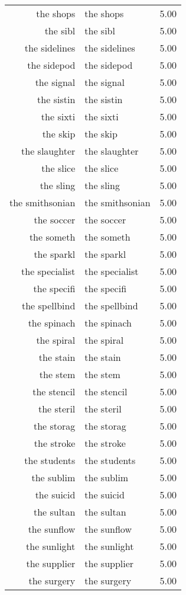 \begin{table}[ht]
\begin{tabular}{rlr}
  the shops & the shops & 5.00 \\ 
  the sibl & the sibl & 5.00 \\ 
  the sidelines & the sidelines & 5.00 \\ 
  the sidepod & the sidepod & 5.00 \\ 
  the signal & the signal & 5.00 \\ 
  the sistin & the sistin & 5.00 \\ 
  the sixti & the sixti & 5.00 \\ 
  the skip & the skip & 5.00 \\ 
  the slaughter & the slaughter & 5.00 \\ 
  the slice & the slice & 5.00 \\ 
  the sling & the sling & 5.00 \\ 
  the smithsonian & the smithsonian & 5.00 \\ 
  the soccer & the soccer & 5.00 \\ 
  the someth & the someth & 5.00 \\ 
  the sparkl & the sparkl & 5.00 \\ 
  the specialist & the specialist & 5.00 \\ 
  the specifi & the specifi & 5.00 \\ 
  the spellbind & the spellbind & 5.00 \\ 
  the spinach & the spinach & 5.00 \\ 
  the spiral & the spiral & 5.00 \\ 
  the stain & the stain & 5.00 \\ 
  the stem & the stem & 5.00 \\ 
  the stencil & the stencil & 5.00 \\ 
  the steril & the steril & 5.00 \\ 
  the storag & the storag & 5.00 \\ 
  the stroke & the stroke & 5.00 \\ 
  the students & the students & 5.00 \\ 
  the sublim & the sublim & 5.00 \\ 
  the suicid & the suicid & 5.00 \\ 
  the sultan & the sultan & 5.00 \\ 
  the sunflow & the sunflow & 5.00 \\ 
  the sunlight & the sunlight & 5.00 \\ 
  the supplier & the supplier & 5.00 \\ 
  the surgery & the surgery & 5.00 \\ 

\end{tabular}
\end{table}

